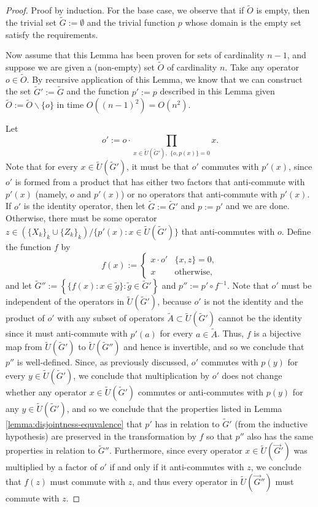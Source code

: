 \documentclass[12pt]{amsbook}
\theoremstyle{plain}
\theoremstyle{definition}
\theoremstyle{remark}
\newcommand{\lst}{\vec}
\newcommand{\set}{\tilde}
\newcommand{\paren}[1]{\left(#1\right)}
\begin{document}
\begin{proof}
Proof by induction.  For the base case, we observe that if $\set O$ is empty, then the trivial set $\set G:=\emptyset$ and the trivial function $p$ whose domain is the empty set satisfy the requirements.

Now assume that this Lemma has been proven for sets of cardinality $n-1$, and suppose we are given a (non-empty) set $\set O$ of cardinality $n$.  Take any operator $o\in\set O$.  By recursive application of this Lemma, we know that we can construct the set $\set G':=\set G$ and the function $p':=p$ described in this Lemma given $\set O:=\set O\backslash\{o\}$ in time $O\paren{(n-1)^2}=O(n^2)$.

Let $$o':=o\cdot \prod_{x\in\set U(\set G'),\,\,\{o,p(x)\}=0} x.$$  Note that for every $x\in\set U(\set G')$, it must be that $o'$ commutes with $p'(x)$, since $o'$ is formed from a product that has either two factors that anti-commute with $p'(x)$ (namely, $o$ and $p'(x)$) or no operators that anti-commute with $p'(x)$.  If $o'$ is the identity operator, then let $\set G:=\set G'$ and $p:=p'$ and we are done.  Otherwise, there must be some operator $z\in\paren{\{X_k\}_k \cup \{Z_k\}_k}\slash\{p'(x):x\in\set U(\set G')\}$ that anti-commutes with $o$.  Define the function $f$ by
$$f(x) :=
\begin{cases}
x \cdot o' & \{x,z\}=0, \\
x          & \text{otherwise},
\end{cases}
$$
and let $\set G'':=\left\{\{f(x):x\in\set g\}:\set g\in\set G'\right\}$ and $p'':=p'\circ f^{-1}$.  Note that $o'$ must be independent of the operators in $\set U(\set G')$, because $o'$ is not the identity and the product of $o'$ with any subset of operators $\set A\subset\set U(\set G')$ cannot be the identity since it must anti-commute with $p'(a)$ for every $a\in\set A$.  Thus, $f$ is a bijective map from $\set U(\set G')$ to $\set U(\set G'')$ and hence is invertible, and so we conclude that $p''$ is well-defined.  Since, as previously discussed, $o'$ commutes with $p(y)$ for every $y\in\set U(\set G')$, we conclude that multiplication by $o'$ does not change whether any operator $x\in\set U(\set G')$ commutes or anti-commutes with $p(y)$ for any $y\in\set U(\set G')$, and so we conclude that the properties listed in Lemma \ref{lemma:disjointness-equvalence} that $p'$ has in relation to $\set G'$ (from the inductive hypothesis) are preserved in the transformation by $f$ so that $p''$ also has the same properties in relation to $\set G''$.  Furthermore, since every operator $x\in\set U(\lst G')$ was multiplied by a factor of $o'$ if and only if it anti-commutes with $z$, we conclude that $f(z)$ must commute with $z$, and thus every operator in $\set U(\lst G'')$ must commute with $z$.


\end{proof}
\end{document}
